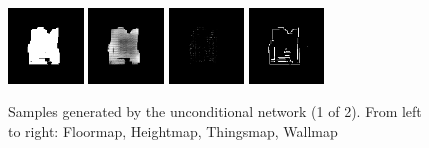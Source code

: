 \begin{figure}[h!]
\begin{minipage}[b]{\linewidth}
	\begin{center}
		\includegraphics[width=2cm]{figures/results/samples/uncond/sample28_map_floormap_generated.png}
		\includegraphics[width=2cm]{figures/results/samples/uncond/sample28_map_heightmap_generated.png}
		\includegraphics[width=2cm]{figures/results/samples/uncond/sample28_map_thingsmap_generated.png}
		\includegraphics[width=2cm]{figures/results/samples/uncond/sample28_map_wallmap_generated.png}
	\end{center}
	

	
\end{minipage}
\caption[Samples Generated by the Unconditional network (1 of 2)]{Samples generated by the unconditional network (1 of 2). From left to right: Floormap, Heightmap, Thingsmap, Wallmap}
\end{figure}
